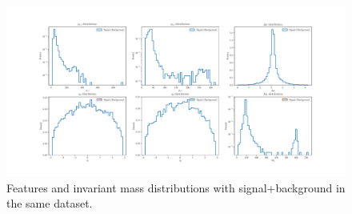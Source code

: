 \begin{figure}[H]
	\begin{center}
		\includegraphics[width=1.0\textwidth]{Python/Z/sig_plus_bkg.pdf}
		\caption{Features and invariant mass distributions with signal+background in the same dataset.}
		\label{fig:SIG_PLUS_BKG_DISTRIBUTIONS}
	\end{center}
\end{figure}